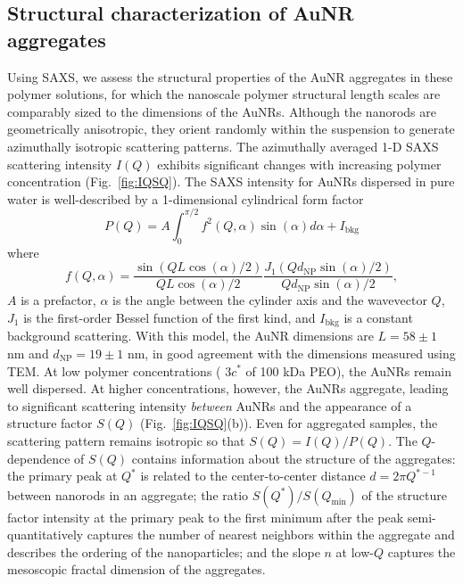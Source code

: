 \documentclass[journal=jacsat, superscriptaddress]{achemso}
\def\EDITS#1{{\color{black}#1}}
\def\EDITS#1{#1}
\begin{document}
\subsection{Structural characterization of AuNR aggregates}

Using SAXS, we assess the structural properties of the AuNR aggregates in these polymer solutions, for which the nanoscale polymer structural length scales are comparably sized to the dimensions of the AuNRs. \EDITS{Although the nanorods are geometrically anisotropic, they orient randomly within the suspension to generate azimuthally isotropic scattering patterns.} The \EDITS{azimuthally averaged 1-D} SAXS scattering intensity $I(Q)$ exhibits significant changes with increasing polymer concentration (Fig.\ \ref{fig:IQSQ}). The SAXS intensity for AuNRs dispersed in pure water is well-described by a 1-dimensional cylindrical form factor\cite{Guinier1955} 
\begin{equation}
P(Q) = A\int_0^{\pi/2} f^2(Q,\alpha) \sin(\alpha) d\alpha + I_\mathrm{bkg}
\label{eqn:cylinder_form_factor}
\end{equation}
where
\begin{equation}
f(Q,\alpha) = \frac{\sin (QL\cos(\alpha)/2)}{QL \cos(\alpha)/2} \frac{J_1(Qd_\mathrm{NP}\sin(\alpha)/2)}{Qd_\mathrm{NP}\sin (\alpha)/2},
\end{equation}
$A$ is a prefactor, $\alpha$ is the angle between the cylinder axis and the wavevector $Q$, $J_1$ is the first-order Bessel function of the first kind, and $I_\mathrm{bkg}$ is a constant background scattering. With this model, the AuNR dimensions are $L = 58 \pm 1$ nm and $d_\mathrm{NP} = 19 \pm 1$ nm, in good agreement with the dimensions measured using TEM. At low polymer concentrations ( $3c^*$ of 100 kDa PEO), the AuNRs remain well dispersed. At higher concentrations, however, the AuNRs aggregate, leading to  significant scattering intensity \emph{between} AuNRs and the appearance of a structure factor $S(Q)$ (Fig.\ \ref{fig:IQSQ}(b)). \EDITS{Even for aggregated samples, the scattering pattern remains isotropic so that $S(Q) = I(Q)/P(Q)$.} The $Q$-dependence of $S(Q)$ contains information about the structure of the aggregates: the primary peak at $Q^*$ is related to the center-to-center distance $d = 2\pi Q^{*-1}$ between nanorods in an aggregate; the ratio $S(Q^*)/S(Q_\mathrm{min})$ of the structure factor intensity at the primary peak to the first minimum after the peak semi-quantitatively captures the number of nearest neighbors within the aggregate and describes the ordering of the nanoparticles; and the slope $n$ at low-$Q$ captures the mesoscopic fractal dimension of the aggregates.
\end{document}
